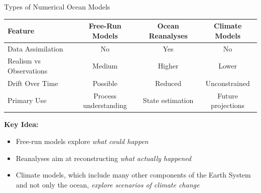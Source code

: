 \documentclass[english,aspectratio=169]{beamer}
\begin{document}
\begin{frame}{Types of Numerical Ocean Models}
\small{
\begin{table}[]
\centering
\begin{tabular}{lccc}
\hline
\textbf{Feature} & \textbf{Free-Run Models} & \textbf{Ocean Reanalyses} & \textbf{Climate Models}\\
\hline
Data Assimilation & No & Yes & No \\
Realism vs Observations & Medium & Higher & Lower \\
Drift Over Time & Possible & Reduced & Unconstrained \\
Primary Use & Process understanding & State estimation & Future projections \\
\hline
\end{tabular}
\end{table}
\vspace{0.5cm}
\textbf{Key Idea:}
\begin{itemize}
\item Free-run models explore \textit{what could happen} 
\item Reanalyses aim at reconstructing \textit{what actually happened}
\item Climate models, which include many other components of the Earth System and not only the ocean, \textit{explore scenarios of climate change}
\end{itemize}
}
\end{frame}
\end{document}

